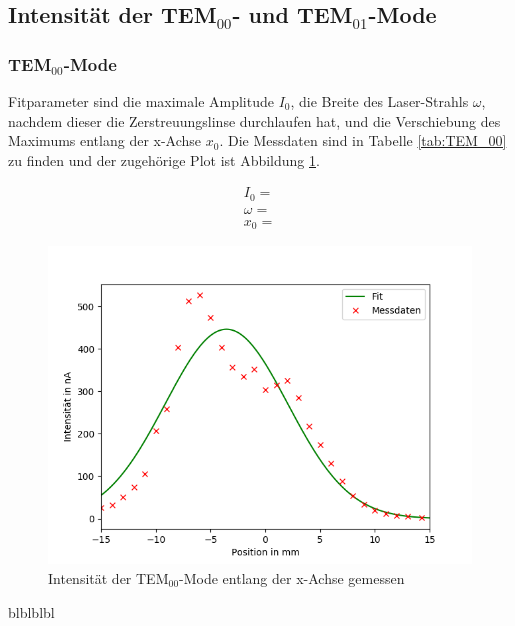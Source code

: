 \subsection{Intensität der TEM$_{00}$- und TEM$_{01}$-Mode}
\subsubsection{TEM$_{00}$-Mode}

Fitparameter sind die maximale Amplitude $I_0$, die Breite des Laser-Strahls $\omega$, nachdem dieser die Zerstreuungslinse durchlaufen hat, und die Verschiebung des Maximums entlang der x-Achse $x_0$. Die Messdaten sind in Tabelle \ref{tab:TEM_00} zu finden und der zugehörige Plot ist Abbildung \ref{fig:TEM_00}.

\begin{align}
	I_0 =  \\
	\omega =   \\
	x_0 = 
\end{align}
	
 


\begin{figure}[h!]
	\centering
	\includegraphics[width=.6\textwidth]{build/TEM_00.png}
	\caption{Intensität der TEM$_{00}$-Mode entlang der x-Achse gemessen}
	\label{fig:TEM_00}
\end{figure} 

blblblbl